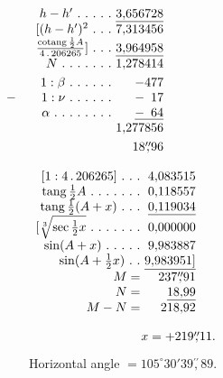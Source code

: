 \begin{minipage}[t]{.31\linewidth}\centering
$\begin{array}{r@{\ }r}
h-h'\ .\ .\ .\ .\ .&\underline{3{,}656728}\\
{[}(h-h')^2\ .\ .\ .&7{,}313456\\
\frac{\operatorname{cotang}\frac12A}{4\,.\,206265}]\ .\ .\ .&\underline{3{,}964958}\\
N\ .\ .\ .\ .\ .\ .\ .&1{,}278414\\[3pt]
1:\beta\ .\ .\ .\ .\ .\ .&-477\\
\makebox[0pt][r]{$-$\qquad}1:\nu\ .\ .\ .\ .\ .\ .&-\phantom{1}17\\
\alpha\ .\ .\ .\ .\ .\ .\ .\ .&\underline{-\phantom{1}64}\\
&1{,}277856\\[3pt]
&18\overset{\prime\prime}{,}96
\end{array}$
\end{minipage}\hfill
\begin{minipage}[t]{.34\linewidth}\centering
$\begin{array}{r@{\ }r}
{[}1:4\,.\,206265]\ .\ .\ .&4{,}083515\\
\operatorname{tang}\tfrac12A\ .\ .\ .\ .\ .\ .\ .&0{,}118557\\
\operatorname{tang}\tfrac12(A+x)\ .\ .\ .&\underline{0{,}119034}\\
{[}\sqrt[3]{\sec\tfrac12x}\ .\ .\ .\ .\ .\ .\ .&0{,}000000\\
\sin(A+x)\ .\ .\ .\ .\ .&9{,}983887\\
\sin(A+\tfrac12x)\ .\ .&\underline{9{,}983951]}\\
M=&237\overset{\prime\prime}{,}91\\
N=&\underline{18{,}99}\\
M-N=&218{,}92
\end{array}$
\end{minipage}
\[
x=+219\overset{\prime\prime}{,}11.\hspace*{.36\linewidth}
\]
\noindent Horizontal angle $=105^\circ30'39\overset{\prime\prime}{,}89$.

